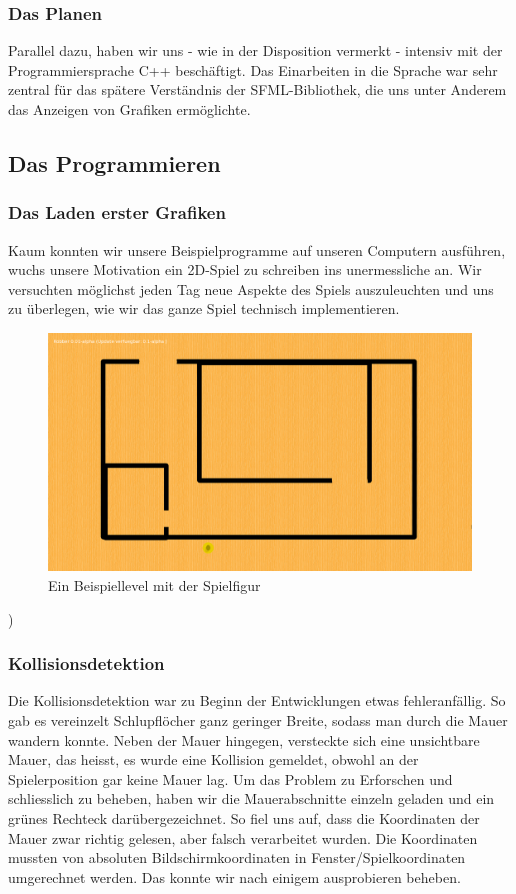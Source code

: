 \documentclass[12pt,a4paper]{scrartcl}
\begin{document}
\subsubsection{Das Planen}


Parallel dazu, haben wir uns - wie in der
Disposition vermerkt - intensiv mit der Programmiersprache C++ beschäftigt. Das Einarbeiten
in die Sprache war sehr zentral für das spätere Verständnis der SFML-Bibliothek, die uns
unter Anderem das Anzeigen von Grafiken ermöglichte.

\subsection{Das Programmieren}
\subsubsection{Das Laden erster Grafiken}
Kaum konnten wir unsere Beispielprogramme auf unseren Computern ausführen, wuchs unsere Motivation
ein 2D-Spiel zu schreiben ins unermessliche an. Wir versuchten möglichst jeden Tag neue Aspekte
des Spiels auszuleuchten und uns zu überlegen, wie wir das ganze Spiel technisch implementieren.
\begin{figure}[h]
\centering
\includegraphics[scale=0.25]{img/grafiken.png}
\caption{Ein Beispiellevel mit der Spielfigur}
\end{figure}
)

\subsubsection{Kollisionsdetektion}
Die Kollisionsdetektion war zu Beginn der Entwicklungen etwas fehleranfällig. So gab es vereinzelt
Schlupflöcher ganz geringer Breite, sodass man durch die Mauer wandern konnte. Neben der Mauer hingegen,
versteckte sich eine unsichtbare Mauer, das heisst, es wurde eine Kollision gemeldet, obwohl an der
Spielerposition gar keine Mauer lag. Um das Problem zu Erforschen und schliesslich zu beheben, haben
wir die Mauerabschnitte einzeln geladen und ein grünes Rechteck darübergezeichnet. So fiel uns auf, dass
die Koordinaten der Mauer zwar richtig gelesen, aber falsch verarbeitet wurden. Die Koordinaten mussten
von absoluten Bildschirmkoordinaten in Fenster/Spielkoordinaten umgerechnet werden. Das konnte wir nach einigem ausprobieren beheben.
\end{document}
